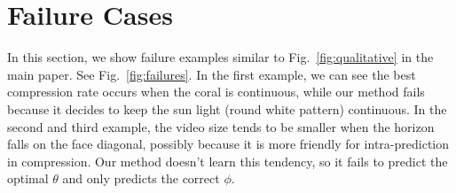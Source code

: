 \documentclass[journal,transmag]{IEEEtran}
\begin{document}
\section{Failure Cases}

In this section, we show failure examples similar to Fig.~\ref{fig:qualitative} in the main paper.
See Fig.~\ref{fig:failures}.
In the first example,
we can see the best compression rate occurs when the coral is continuous,
while our method fails because it decides to keep the sun light (round white pattern) continuous.
In the second and third example,
the video size tends to be smaller when the horizon falls on the face diagonal,
possibly because it is more friendly for intra-prediction in compression.
Our method doesn't learn this tendency,
so it fails to predict the optimal $\theta$ and only predicts the correct $\phi$.
\end{document}
